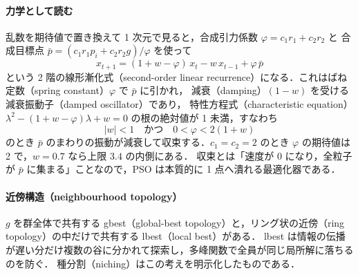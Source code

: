 \documentclass[a4paper,11pt]{article}
\begin{document}
{\paragraph{力学として読む}
乱数を期待値で置き換えて 1 次元で見ると，合成引力係数 $\varphi = c_1 r_1 + c_2 r_2$ と
合成目標点 $\bar p = (c_1 r_1 p_i + c_2 r_2 g)/\varphi$ を使って
\begin{equation}
  x_{t+1} = (1 + w - \varphi)\, x_t - w\, x_{t-1} + \varphi\, \bar p
  \label{eq:pso-recurrence}
\end{equation}
という 2 階の線形漸化式（second-order linear recurrence）になる．これはばね定数（spring constant）$\varphi$ で $\bar p$ に引かれ，
減衰（damping）$(1 - w)$ を受ける減衰振動子（damped oscillator）であり，
特性方程式（characteristic equation）$\lambda^2 - (1 + w - \varphi)\lambda + w = 0$ の根の絶対値が 1 未満，すなわち
\begin{equation}
  \lvert w \rvert < 1 \quad\text{かつ}\quad 0 < \varphi < 2(1 + w)
  \label{eq:pso-stability}
\end{equation}
のとき $\bar p$ のまわりの振動が減衰して収束する．$c_1 = c_2 = 2$ のとき $\varphi$ の期待値は 2 で，$w = 0.7$ なら上限 $3.4$ の内側にある．
収束とは「速度が 0 になり，全粒子が $\bar p$ に集まる」ことなので，PSO は本質的に 1 点へ潰れる最適化器である．

\paragraph{近傍構造（neighbourhood topology）}
$g$ を群全体で共有する gbest（global-best topology）と，リング状の近傍（ring topology）の中だけで共有する lbest（local best）がある．
lbest は情報の伝播が遅い分だけ複数の谷に分かれて探索し，多峰関数で全員が同じ局所解に落ちるのを防ぐ．
種分割（niching）はこの考えを明示化したものである．

}
\end{document}
